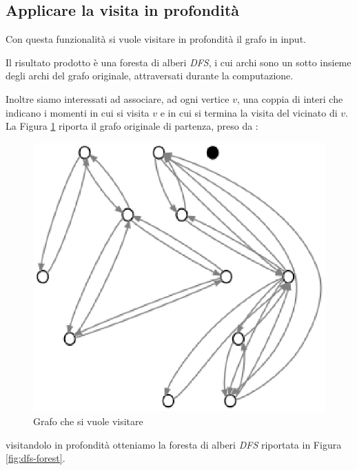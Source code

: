 \subsection{Applicare la visita in profondit\`a}
\label{subsection:apply-depth-first-search}
Con questa funzionalit\`a si vuole visitare in profondit\`a il grafo
in input.

Il risultato prodotto \`e una foresta di alberi \emph{DFS}, i cui
archi sono un sotto insieme degli archi del grafo originale,
attraversati durante la computazione.

Inoltre siamo interessati ad associare, ad ogni vertice $v$, una
coppia di interi che indicano i momenti in cui si visita $v$ e in cui
si termina la visita del vicinato di $v$. La Figura
\ref{fig:before-applying-dfs-search} riporta il grafo originale di
partenza, preso da \cite{Algorithms}:
\begin{figure}
  \centering
  \includegraphics{images/OnePipingLevelUnitTest_Printer_DFS_PrinterPipe_Papadimitriou-phase-PrinterPipeFilter-level-0.eps}
  \caption{Grafo che si vuole visitare}
  \label{fig:before-applying-dfs-search}
\end{figure}
visitandolo in profondit\`a otteniamo la foresta di alberi \emph{DFS}
riportata in Figura \ref{fig:dfs-forest}.
